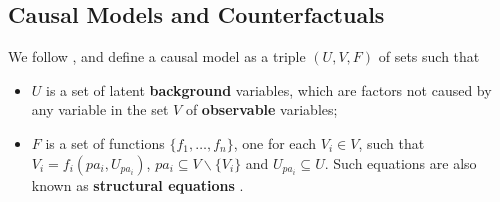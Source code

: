


\subsection{Causal Models and Counterfactuals}
\label{subsec:cmc}
We follow %
\citet{pearl:00}, and define a causal
model as a triple $(U, V, F)$ of sets such that
%
\begin{itemize}
\item $U$ is a set of latent {\bf background} variables,%
  which are factors not caused by any variable in the set $V$ of {\bf observable} variables;
\item $F$ is a set of functions $\{f_1, \dots, f_n\}$, one for each $V_i \in V$, such
that $V_i = f_i(pa_i, U_{pa_i})$, $pa_i \subseteq V \backslash
\{V_i\}$ and $U_{pa_i} \subseteq U$. Such equations are also known as
{\bf structural equations} \citep{bol:89}.
\end{itemize}
%


